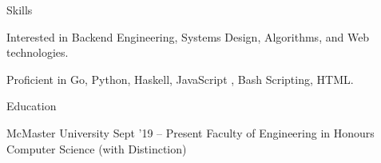 \documentclass{resume} %
\begin{document}

\begin{rSection}{Skills}

  {
    \item Interested in Backend Engineering, Systems Design, Algorithms, and Web technologies.
    \item  Proficient in Go, Python, Haskell, JavaScript , Bash Scripting, HTML.
  }

\end{rSection}


\begin{rSection}{Education}
  \begin{rEducationSection}{McMaster University}
                           {Sept '19 -- Present}
                           {Faculty of Engineering in Honours Computer Science (with Distinction)}
  \end{rEducationSection}
\end{rSection}

\end{document}
